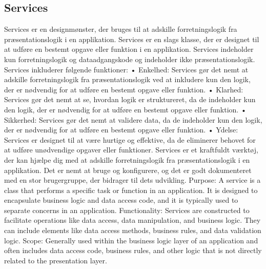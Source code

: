 \subsection{Services}
Services er en designmønster, der bruges til at adskille forretningslogik fra præsentationslogik i en applikation. Services er en slags klasse, der er designet til at udføre en bestemt opgave eller funktion i en applikation. Services indeholder kun forretningslogik og dataadgangskode og indeholder ikke præsentationslogik.
Services inkluderer følgende funktioner:
•	Enkelhed: Services gør det nemt at adskille forretningslogik fra præsentationslogik ved at inkludere kun den logik, der er nødvendig for at udføre en bestemt opgave eller funktion.
•	Klarhed: Services gør det nemt at se, hvordan logik er struktureret, da de indeholder kun den logik, der er nødvendig for at udføre en bestemt opgave eller funktion.
•	Sikkerhed: Services gør det nemt at validere data, da de indeholder kun den logik, der er nødvendig for at udføre en bestemt opgave eller funktion.
•	Ydelse: Services er designet til at være hurtige og effektive, da de eliminerer behovet for at udføre unødvendige opgaver eller funktioner.
Services er et kraftfuldt værktøj, der kan hjælpe dig med at adskille forretningslogik fra præsentationslogik i en applikation. Det er nemt at bruge og konfigurere, og det er godt dokumenteret med en stor brugergruppe, der bidrager til dets udvikling.
Purpose: A service is a class that performs a specific task or function in an application. It is designed to encapsulate business logic and data access code, and it is typically used to separate concerns in an application.
Functionality: Services are constructed to facilitate operations like data access, data manipulation, and business logic. They can include elements like data access methods, business rules, and data validation logic.
Scope: Generally used within the business logic layer of an application and often includes data access code, business rules, and other logic that is not directly related to the presentation layer.

